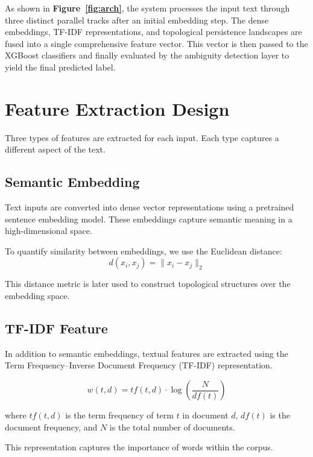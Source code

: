 As shown in \textbf{Figure~\ref{fig:arch}}, the system processes the input text through three distinct
parallel tracks after an initial embedding step. The dense embeddings, TF-IDF representations,
and topological persistence landscapes are fused into a single comprehensive feature vector.
This vector is then passed to the XGBoost classifiers and finally evaluated by the ambiguity
detection layer to yield the final predicted label.

\section{Feature Extraction Design}

Three types of features are extracted for each input. Each type captures a different aspect of the
text.

\subsection{Semantic Embedding}

Text inputs are converted into dense vector representations using a pretrained sentence
embedding model. These embeddings capture semantic meaning in a high-dimensional space.

To quantify similarity between embeddings, we use the Euclidean distance:
\begin{equation}
d(x_i, x_j) = \|x_i - x_j\|_2
\end{equation}

This distance metric is later used to construct topological structures over the embedding space.

\subsection{TF-IDF Feature}

In addition to semantic embeddings, textual features are extracted using the Term
Frequency--Inverse Document Frequency (TF-IDF) representation.

\begin{equation}
w(t, d) = tf(t, d) \cdot \log\left(\frac{N}{df(t)}\right)
\end{equation}

where $tf(t, d)$ is the term frequency of term $t$ in document $d$, $df(t)$ is the document
frequency, and $N$ is the total number of documents.

This representation captures the importance of words within the corpus.

